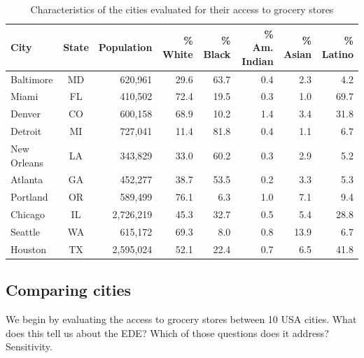 \documentclass[final,3p,times,onecolumn,sort&compress]{elsarticle}
\begin{document}
\begin{table}[h]
\caption{Characteristics of the cities evaluated for their access to grocery stores}
\label{tab:city_dem}
\centering
\begin{tabular}{l c r r r r r r} 
    \hline
    City & State & Population & \% White & \% Black & \% Am. Indian & \% Asian & \% Latino \\
    \hline
    Baltimore   & MD & 620,961  & 29.6 & 63.7 & 0.4 & 2.3  & 4.2  \\
    Miami       & FL & 410,502  & 72.4 & 19.5 & 0.3 & 1.0  & 69.7 \\
    Denver      & CO & 600,158  & 68.9 & 10.2 & 1.4 & 3.4  & 31.8 \\
    Detroit     & MI & 727,041  & 11.4 & 81.8 & 0.4 & 1.1  & 6.7  \\
    New Orleans & LA & 343,829  & 33.0 & 60.2 & 0.3 & 2.9  & 5.2  \\
    Atlanta     & GA & 452,277  & 38.7 & 53.5 & 0.2 & 3.3  & 5.3  \\
    Portland    & OR & 589,499  & 76.1 & 6.3  & 1.0 & 7.1  & 9.4  \\
    Chicago     & IL & 2,726,219 & 45.3 & 32.7 & 0.5 & 5.4  & 28.8 \\
    Seattle     & WA & 615,172  & 69.3 & 8.0  & 0.8 & 13.9 & 6.7  \\
    Houston     & TX & 2,595,024 & 52.1 & 22.4 & 0.7 & 6.5  & 41.8 \\
    \hline
\end{tabular}
\end{table}

\subsection{Comparing cities}
We begin by evaluating the access to grocery stores between 10 USA cities.
What does this tell us about the EDE? 
Which of those questions does it address?
Sensitivity.
\end{document}

